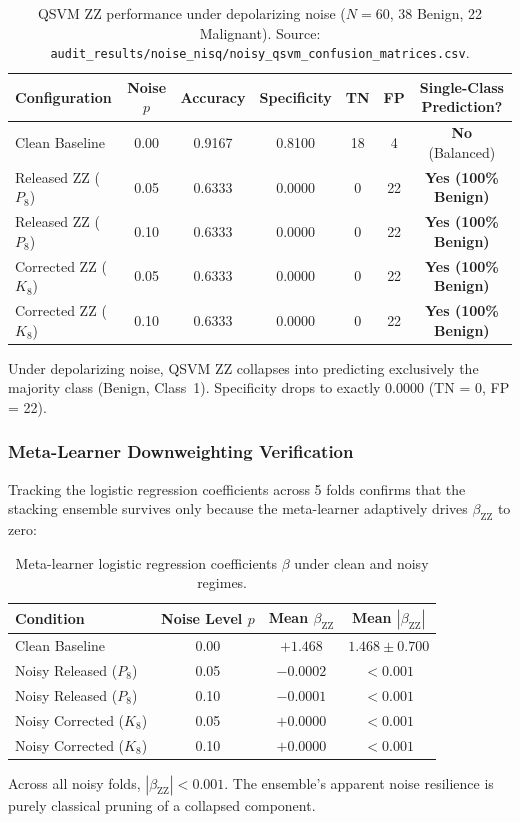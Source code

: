 \begin{table}[H]
\centering
\small
\caption{QSVM ZZ performance under depolarizing noise ($N=60$, 38 Benign, 22 Malignant). Source: \texttt{audit\_results/noise\_nisq/noisy\_qsvm\_confusion\_matrices.csv}.}
\label{tab:qsvm-noise-collapse}
\begin{tabularx}{\textwidth}{lcccccc}
\toprule
\textbf{Configuration} & \textbf{Noise $p$} & \textbf{Accuracy} & \textbf{Specificity} & \textbf{TN} & \textbf{FP} & \textbf{Single-Class Prediction?} \\
\midrule
Clean Baseline & 0.00 & 0.9167 & 0.8100 & 18 & 4 & \textbf{No} (Balanced) \\
Released ZZ ($P_8$) & 0.05 & 0.6333 & 0.0000 & 0 & 22 & \textbf{Yes (100\% Benign)} \\
Released ZZ ($P_8$) & 0.10 & 0.6333 & 0.0000 & 0 & 22 & \textbf{Yes (100\% Benign)} \\
Corrected ZZ ($K_8$) & 0.05 & 0.6333 & 0.0000 & 0 & 22 & \textbf{Yes (100\% Benign)} \\
Corrected ZZ ($K_8$) & 0.10 & 0.6333 & 0.0000 & 0 & 22 & \textbf{Yes (100\% Benign)} \\
\bottomrule
\end{tabularx}
\end{table}

Under depolarizing noise, QSVM ZZ collapses into predicting exclusively the majority class (Benign, Class~1). Specificity drops to exactly $0.0000$ (TN = 0, FP = 22).

\subsubsection{Meta-Learner Downweighting Verification}
Tracking the logistic regression coefficients across 5 folds confirms that the stacking ensemble survives only because the meta-learner adaptively drives $\beta_{\mathrm{ZZ}}$ to zero:
\begin{table}[H]
\centering
\small
\caption{Meta-learner logistic regression coefficients $\beta$ under clean and noisy regimes.}
\begin{tabular}{lccc}
\toprule
\textbf{Condition} & \textbf{Noise Level $p$} & \textbf{Mean $\beta_{\mathrm{ZZ}}$} & \textbf{Mean $|\beta_{\mathrm{ZZ}}|$} \\
\midrule
Clean Baseline & 0.00 & $+1.468$ & $1.468 \pm 0.700$ \\
Noisy Released ($P_8$) & 0.05 & $-0.0002$ & $< 0.001$ \\
Noisy Released ($P_8$) & 0.10 & $-0.0001$ & $< 0.001$ \\
Noisy Corrected ($K_8$) & 0.05 & $+0.0000$ & $< 0.001$ \\
Noisy Corrected ($K_8$) & 0.10 & $+0.0000$ & $< 0.001$ \\
\bottomrule
\end{tabular}
\end{table}
Across all noisy folds, $|\beta_{\mathrm{ZZ}}| < 0.001$. The ensemble's apparent noise resilience is purely classical pruning of a collapsed component.


